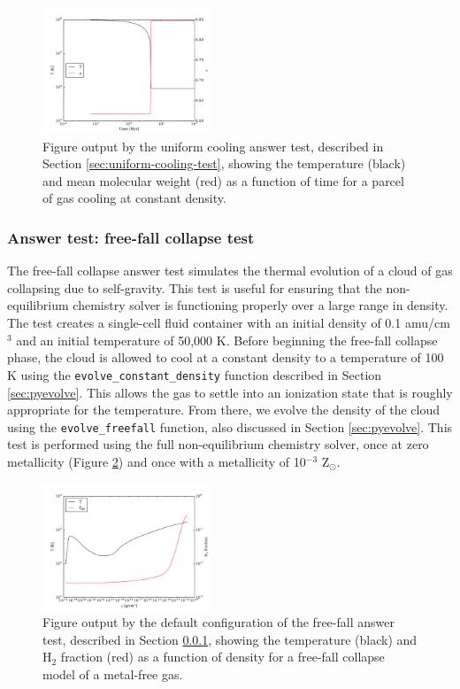 \begin{figure}
  \centering
  \includegraphics[width=0.45\textwidth]{cooling_cell.pdf}
  \caption{
    Figure output by the uniform cooling answer test, described in
    Section \ref{sec:uniform-cooling-test}, showing the temperature
    (black) and mean molecular weight (red) as a function of time for
    a parcel of gas cooling at constant density.
  } \label{fig:uniform-cooling-test}
\end{figure}

\subsubsection{Answer test: free-fall collapse test}
\label{sec:free-fall-test}

The free-fall collapse answer test simulates the thermal evolution of
a cloud of gas collapsing due to self-gravity.  This test is useful
for ensuring that the non-equilibrium chemistry solver is functioning
properly over a large range in density.  The test creates a
single-cell fluid container with an initial density of 0.1
amu/cm$^{3}$ and an initial temperature of
50,000 K.  Before beginning the free-fall collapse phase, the cloud is
allowed to cool at a constant density to a temperature of 100 K using
the \texttt{evolve\_constant\_density} function described in Section
\ref{sec:pyevolve}.  This allows the gas to settle into an ionization
state that is roughly appropriate for the temperature.  From there, we
evolve the density of the cloud using the \texttt{evolve\_freefall}
function, also discussed in Section \ref{sec:pyevolve}.  This test is
performed using the full non-equilibrium chemistry solver, once at
zero metallicity (Figure \ref{fig:free-fall-test}) and once with a
metallicity of 10$^{-3}$ Z$_{\odot}$.

\begin{figure}
  \centering
  \includegraphics[width=0.45\textwidth]{freefall.pdf}
  \caption{
    Figure output by the default configuration of the free-fall answer
    test, described in Section \ref{sec:free-fall-test}, showing the
    temperature (black) and H$_{2}$ fraction (red) as a function of
    density for a free-fall collapse model of a metal-free gas.
  } \label{fig:free-fall-test}
\end{figure}

